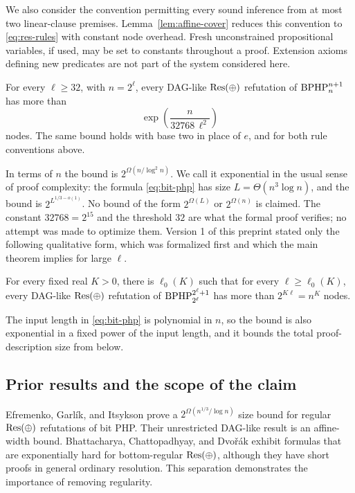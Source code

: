 We also consider the convention permitting every sound inference from at
most two linear-clause premises. Lemma~\ref{lem:affine-cover} reduces this
convention to \eqref{eq:res-rules} with constant node overhead.
Fresh unconstrained propositional variables, if used, may be set to
constants throughout a proof. Extension axioms defining new predicates
are not part of the system considered here.

\begin{theorem}\label{thm:main}
For every \(\ell\ge32\), with \(n=2^\ell\), every DAG-like \(\mathrm{Res}(\oplus)\)
refutation of \(\mathrm{BPHP}_{n}^{n+1}\) has more than
\[
 \exp\!\left(\frac{n}{32768\,\ell^2}\right)
\]
nodes. The same bound holds with base two in place of \(e\), and for both
rule conventions above.
\end{theorem}

In terms of \(n\) the bound is \(2^{\Omega(n/\log^2n)}\). We call it
exponential in the usual sense of proof complexity: the formula
\eqref{eq:bit-php} has size \(L=\Theta(n^3\log n)\), and the bound is
\(2^{L^{1/3-o(1)}}\). No bound of the form \(2^{\Omega(L)}\) or
\(2^{\Omega(n)}\) is claimed. The constant
\(32768=2^{15}\) and the threshold \(32\) are what the formal proof
verifies; no attempt was made to optimize them. Version 1 of this preprint
stated only the following qualitative form, which was formalized first and
which the main theorem implies for large \(\ell\).

\begin{corollary}\label{cor:main-superpolynomial}
For every fixed real \(K>0\), there is \(\ell_0(K)\) such that for every
\(\ell\ge\ell_0(K)\), every DAG-like \(\mathrm{Res}(\oplus)\) refutation of
\(\mathrm{BPHP}_{2^\ell}^{2^\ell+1}\) has more than \(2^{K\ell}=n^K\) nodes.
\end{corollary}

The input length in \eqref{eq:bit-php} is polynomial in \(n\), so the bound
is also exponential in a fixed power of the input length, and it bounds the
total proof-description size from below.

\subsection{Prior results and the scope of the claim}
Efremenko, Garl\'ik, and Itsykson \cite{EGI25} prove a
\(2^{\Omega(n^{1/3}/\log n)}\) size bound for regular \(\mathrm{Res}(\oplus)\) refutations
of bit PHP. Their unrestricted DAG-like result is an affine-width bound.
Bhattacharya, Chattopadhyay, and Dvo\v{r}\'ak \cite{BCD24} exhibit formulas
that are exponentially hard for bottom-regular \(\mathrm{Res}(\oplus)\), although they
have short proofs in general ordinary resolution. This separation
demonstrates the importance of removing regularity.

